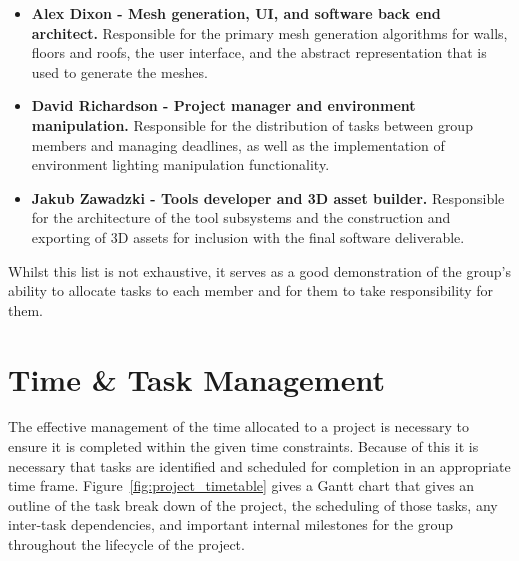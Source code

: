     \begin{itemize}
        \item \textbf{Alex Dixon - Mesh generation, UI, and software back end architect.} Responsible for the primary mesh generation algorithms for walls, floors and roofs, the user interface, and the abstract representation that is used to generate the meshes.
        \item \textbf{David Richardson - Project manager and environment manipulation.} Responsible for the distribution of tasks between group members and managing deadlines, as well as the implementation of environment lighting manipulation functionality.
        \item \textbf{Jakub Zawadzki - Tools developer and 3D asset builder.} Responsible for the architecture of the tool subsystems and the construction and exporting of 3D assets for inclusion with the final software deliverable.
    \end{itemize}
    
    Whilst this list is not exhaustive, it serves as a good demonstration of the group's ability to allocate tasks to each member and for them to take responsibility for them.

\section{Time \& Task Management}
\label{sec:timetable}

    The effective management of the time allocated to a project is necessary to ensure it is completed within the given time constraints. Because of this it is necessary that tasks are identified and scheduled for completion in an appropriate time frame. Figure~\ref{fig:project_timetable} gives a Gantt chart that gives an outline of the task break down of the project, the scheduling of those tasks, any inter-task dependencies, and important internal milestones for the group throughout the lifecycle of the project.
    
